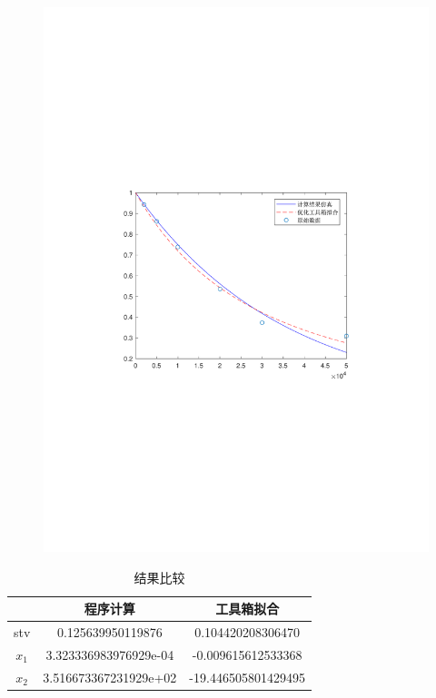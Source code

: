 \begin{figure}[H]
\centering
\includegraphics[width=12cm]{fig/6_2.pdf}
\end{figure}


\begin{table}[H]
\centering
\caption{结果比较}
	\begin{tabular}{ccc}
	\toprule
	{}&程序计算&工具箱拟合\\
	\midrule
	stv&0.125639950119876&0.104420208306470\\
	$x_1$&3.323336983976929e-04&-0.009615612533368\\
	$x_2$&3.516673367231929e+02&-19.446505801429495\\
	\bottomrule
	\end{tabular}
\end{table}



